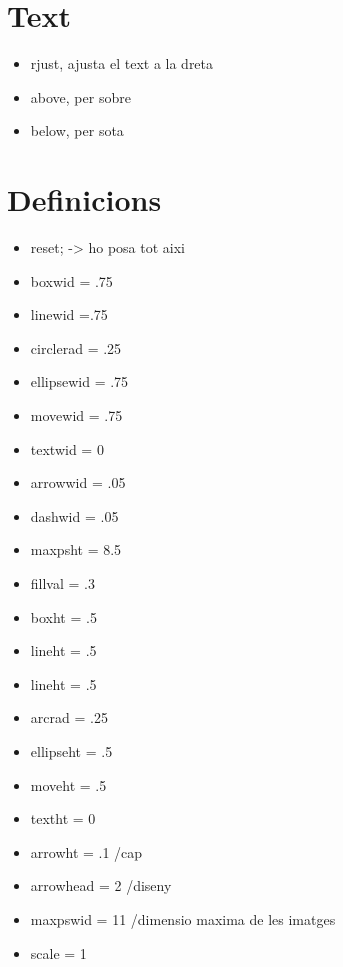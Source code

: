 \section{Text}
\begin{itemize}
\item rjust, ajusta el text a la dreta
\item above, per sobre
\item below, per sota
\end{itemize}

\section{Definicions}
\begin{itemize}
\item reset; -> ho posa tot aixi
\item boxwid = .75
\item linewid =.75
\item circlerad = .25
\item ellipsewid = .75
\item movewid = .75
\item textwid = 0
\item arrowwid = .05
\item dashwid = .05
\item maxpsht = 8.5
\item fillval = .3
\item boxht = .5
\item lineht = .5
\item lineht = .5
\item arcrad = .25
\item ellipseht = .5
\item moveht = .5
\item textht = 0
\item arrowht = .1 /cap
\item arrowhead = 2 /diseny
\item maxpswid = 11 /dimensio maxima de les imatges
\item scale = 1
\end{itemize}
